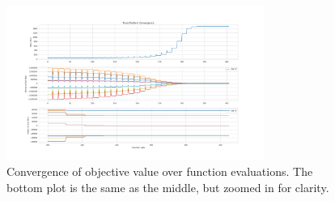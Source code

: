 \documentclass{article}
\begin{document}
\begin{figure}[htbp]
	\centering
	\includegraphics[width=0.75\textwidth]{figures/truss_plot.png}
	\caption{Convergence of objective value over function evaluations. The bottom plot is the same as the middle, but zoomed in for clarity.}
	\label{fig:results}
\end{figure}

\end{document}
